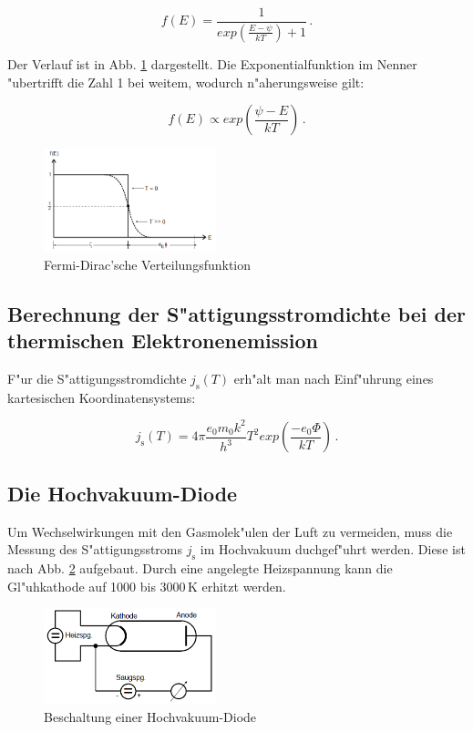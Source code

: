 \begin{equation}
	f(E) = \frac{1}{exp( \frac{E - \psi}{kT} ) + 1} \, .
\end{equation}

Der Verlauf ist in Abb. \ref{fermi} dargestellt.
Die Exponentialfunktion im Nenner "ubertrifft die Zahl 1 bei weitem, wodurch n"aherungsweise gilt:

\begin{equation}
	f(E) \propto exp ( \frac{\psi - E}{kT}) \, .
\end{equation}

\begin{figure}[!h]
	\centering
	\includegraphics[width = 5cm]{img/Fermi.PNG}
	\caption{Fermi-Dirac'sche Verteilungsfunktion}
	\label{fermi}
\end{figure}

\subsection{Berechnung der S"attigungsstromdichte bei der thermischen Elektronenemission} %
\label{sub:berechnung_der_s_attigungsstromdichte_bei_der_thermischen_elektronenemission}

F"ur die S"attigungsstromdichte $j_\mathrm{s}(T)$ erh"alt man nach Einf"uhrung eines kartesischen Koordinatensystems:

\begin{equation}
	j_\mathrm{s}(T) = 4\pi \frac{e_\mathrm{0} m_\mathrm{0} k^2}{h^3} T^2 exp( \frac{-e_\mathrm{0} \Phi}{kT}) \, .
\end{equation}

\subsection{Die Hochvakuum-Diode} %
\label{sub:die_hochvakuum_diode}

Um Wechselwirkungen mit den Gasmolek"ulen der Luft zu vermeiden, muss die Messung des S"attigungsstroms $j_\mathrm{s}$ im Hochvakuum duchgef"uhrt werden.
Diese ist nach Abb. \ref{diode} aufgebaut.
Durch eine angelegte Heizspannung kann die Gl"uhkathode auf 1000 bis 3000\,K erhitzt werden.

\begin{figure}[!h]
	\centering
	\includegraphics[width = 5cm]{img/Diode.PNG}
	\caption{Beschaltung einer Hochvakuum-Diode}
	\label{diode}
\end{figure}